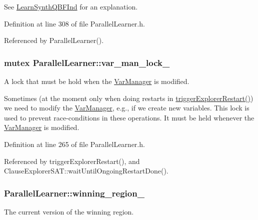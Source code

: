 See \hyperlink{classLearnSynthQBFInd}{Learn\-Synth\-Q\-B\-F\-Ind} for an explanation. 

Definition at line 308 of file Parallel\-Learner.\-h.



Referenced by Parallel\-Learner().

\hypertarget{classParallelLearner_abdd409a5ef29bd4ba6b7213e9d4a067b}{
\subsubsection[{var\-\_\-man\-\_\-lock\-\_\-}]{\setlength{\rightskip}{0pt plus 5cm}mutex Parallel\-Learner\-::var\-\_\-man\-\_\-lock\-\_\-}}\label{classParallelLearner_abdd409a5ef29bd4ba6b7213e9d4a067b}


A lock that must be hold when the \hyperlink{classVarManager}{Var\-Manager} is modified. 

Sometimes (at the moment only when doing restarts in \hyperlink{classParallelLearner_a2b8e4330afb7e99c19d2d7da15c30cc3}{trigger\-Explorer\-Restart()}) we need to modify the \hyperlink{classVarManager}{Var\-Manager}, e.\-g., if we create new variables. This lock is used to prevent race-\/conditions in these operations. It must be held whenever the \hyperlink{classVarManager}{Var\-Manager} is modified. 

Definition at line 265 of file Parallel\-Learner.\-h.



Referenced by trigger\-Explorer\-Restart(), and Clause\-Explorer\-S\-A\-T\-::wait\-Until\-Ongoing\-Restart\-Done().

\hypertarget{classParallelLearner_a7c8383543ff98d7a0356a237756dcdd6}{
\subsubsection[{winning\-\_\-region\-\_\-}]{ Parallel\-Learner\-::winning\-\_\-region\-\_\-}}\label{classParallelLearner_a7c8383543ff98d7a0356a237756dcdd6}


The current version of the winning region. 

